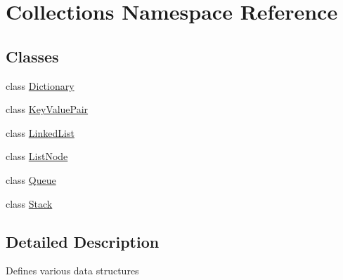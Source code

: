 \hypertarget{namespace_collections}{}\section{Collections Namespace Reference}
\label{namespace_collections}
\subsection*{Classes}
\begin{DoxyCompactItemize}
\item 
class \hyperlink{class_collections_1_1_dictionary}{Dictionary}
\item 
class \hyperlink{class_collections_1_1_key_value_pair}{Key\+Value\+Pair}
\item 
class \hyperlink{class_collections_1_1_linked_list}{Linked\+List}
\item 
class \hyperlink{class_collections_1_1_list_node}{List\+Node}
\item 
class \hyperlink{class_collections_1_1_queue}{Queue}
\item 
class \hyperlink{class_collections_1_1_stack}{Stack}
\end{DoxyCompactItemize}


\subsection{Detailed Description}
Defines various data structures 